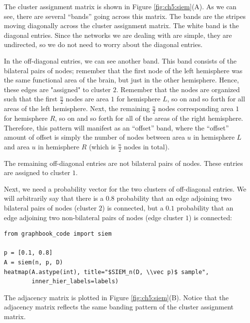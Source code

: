 The cluster assignment matrix is shown in Figure \ref{fig:ch5:siem}(A). As we can see, there are several ``bands'' going across this matrix. The bands are the stripes moving diagonally across the cluster assignment matrix. The white band is the diagonal entries. Since the networks we are dealing with are simple, they are undirected, so we do not need to worry about the diagonal entries.

In the off-diagonal entries, we can see another band. This band consists of the bilateral pairs of nodes; remember that the first node of the left hemisphere was the same functional area of the brain, but just in the other hemisphere. Hence, these edges are "assigned" to cluster $2$. Remember that the nodes are organized such that the first $\frac{n}{2}$ nodes are area $1$ for hemisphere $L$, so on and so forth for all areas of the left hemisphere. Next, the remaining $\frac{n}{2}$ nodes corresponding area $1$ for hemisphere $R$, so on and so forth for all of the areas of the right hemisphere. Therefore, this pattern will manifest as an ``offset'' band, where the ``offset'' amount of offset is simply the number of nodes between area $u$ in hemisphere $L$ and area $u$ in hemisphere $R$ (which is $\frac{n}{2}$ nodes in total). 

The remaining off-diagonal entries are not bilateral pairs of nodes. These entries are assigned to cluster $1$.
 

Next, we need a probability vector for the two clusters of off-diagonal entries. We will arbitrarily say that there is a $0.8$ probability that an edge adjoining two bilateral pairs of nodes (cluster $2$) is connected, but a $0.1$ probability that an edge adjoining two non-bilateral pairs of nodes (edge cluster $1$) is connected:

\begin{lstlisting}[style=python]
from graphbook_code import siem

p = [0.1, 0.8]
A = siem(n, p, D)
heatmap(A.astype(int), title="$SIEM_n(D, \\vec p)$ sample", 
        inner_hier_labels=labels)
\end{lstlisting}

The adjacency matrix is plotted in Figure \ref{fig:ch5:siem}(B). Notice that the adjacency matrix reflects the same banding pattern of the cluster assignment matrix. 

